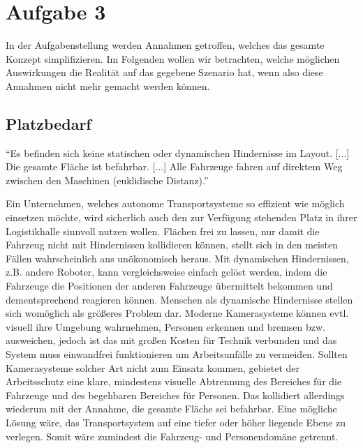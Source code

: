 \documentclass[ngerman]{tudscrreprt}
\begin{document}
\chapter{Aufgabe 3}
In der Aufgabenstellung werden Annahmen getroffen, welches das gesamte Konzept
simplifizieren. Im Folgenden wollen wir betrachten, welche möglichen Auswirkungen die
Realität auf das gegebene Szenario hat, wenn also diese Annahmen nicht mehr gemacht werden
können.

\section{Platzbedarf}
\begin{displayquote}
    ``Es befinden sich keine statischen oder dynamischen Hindernisse im Layout. [...]
    Die gesamte Fläche ist befahrbar. [...] Alle Fahrzeuge fahren auf direktem Weg
    zwischen den Maschinen (euklidische Distanz).'' \cite{aufgabenstellung}
\end{displayquote}
%
Ein Unternehmen, welches autonome Transportsysteme so effizient wie möglich einsetzen
möchte, wird sicherlich auch den zur Verfügung stehenden Platz in ihrer Logistikhalle
sinnvoll nutzen wollen. Flächen frei zu lassen, nur damit die Fahrzeug nicht mit
Hindernissen kollidieren können, stellt sich in den meisten Fällen wahrscheinlich aus
unökonomisch heraus. Mit dynamischen Hindernissen, z.B. andere Roboter, kann
vergleichsweise einfach gelöst werden, indem die Fahrzeuge die Positionen der anderen
Fahrzeuge übermittelt bekommen und dementsprechend reagieren können. Menschen als
dynamische Hindernisse stellen sich womöglich als größeres Problem dar. Moderne
Kamerasysteme können evtl. visuell ihre Umgebung wahrnehmen, Personen erkennen und
bremsen bzw. ausweichen, jedoch ist das mit großen Kosten für Technik verbunden und das
System muss einwandfrei funktionieren um Arbeitsunfälle zu vermeiden. Sollten
Kamerasysteme solcher Art nicht zum Einsatz kommen, gebietet der Arbeitsschutz eine
klare, mindestens visuelle Abtrennung des Bereiches für die Fahrzeuge und des begehbaren
Bereiches für Personen. Das kollidiert allerdings wiederum mit der Annahme, die gesamte
Fläche sei befahrbar. Eine mögliche Lösung wäre, das Transportsystem auf eine tiefer
oder höher liegende Ebene zu verlegen. Somit wäre zumindest die Fahrzeug- und
Personendomäne getrennt.
\end{document}
